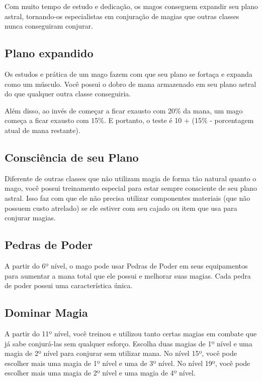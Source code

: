 \documentclass{RPG_Adventure}[2021/10/20]
\begin{document}
Com muito tempo de estudo e dedicação, os magos conseguem expandir seu plano
astral, tornando-os especialistas em conjuração de magias que outras classes
nunca conseguiram conjurar.

\subsection*{Plano expandido}%
\label{sub:plano_expandido}

Os estudos e prática de um mago fazem com que seu plano se fortaça e expanda
como um músculo. Você possui o dobro de mana armazenado em seu plano astral do
que qualquer outra classe conseguiria.

Além disso, ao invés de começar a ficar exausto com 20\% da mana, um mago
começa a ficar exausto com 15\%. E portanto, o teste é 10 + (15\% - porcentagem
atual de mana restante).


\subsection*{Consciência de seu Plano}%
\label{sub:consciencia_de_seu_plano}

Diferente de outras classes que não utilizam magia de forma tão natural quanto o
mago, você possui treinamento especial para estar sempre consciente de seu
plano astral.
Isso faz com que ele não precisa utilizar componentes materiais (que não possuem
custo atrelado) se ele estiver com seu cajado ou item que usa para conjurar
magias.

\subsection*{Pedras de Poder}%
\label{sub:pedras_de_poder}

A partir do 6º nível, o mago pode usar Pedras de Poder em seus equipamentos para
aumentar a mana total que ele possui e melhorar suas magias. Cada pedra de poder
possui uma característica única.

\subsection*{Dominar Magia}%
\label{sub:dominar_magia}

A partir do 11º nível, você treinou e utilizou tanto certas magias em combate
que já sabe conjurá-las sem qualquer esforço. Escolha duas magias de 1º nível e
uma magia de 2º nível para conjurar sem utilizar mana. No nível 15º, você pode
escolher mais uma magia de 1º nível e uma de 3º nível. No nível 19º, você pode
escolher mais uma magia de 2º nível e uma magia de 4º nível.
\end{document}
